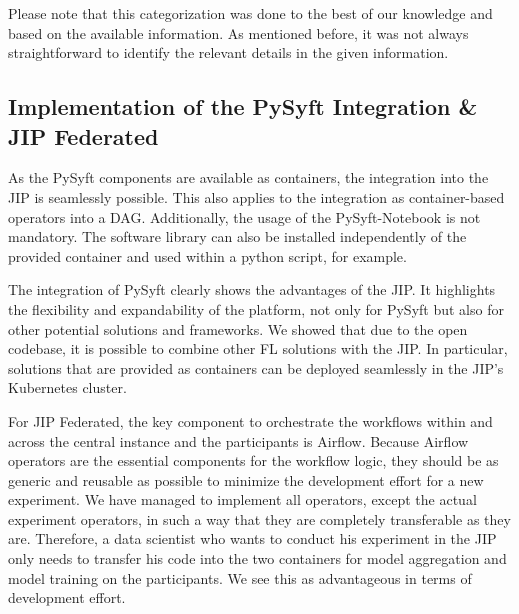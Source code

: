 Please note that this categorization was done to the best of our knowledge and based on the available information. As mentioned before, it was not always straightforward to identify the relevant details in the given information.





\subsection{Implementation of the PySyft Integration \& JIP Federated}
\label{subsec:DiscussionImplementation}
As the PySyft components are available as containers, the integration into the JIP is seamlessly possible. This also applies to the integration as container-based operators into a DAG.
Additionally, the usage of the PySyft-Notebook is not mandatory. The software library can also be installed independently of the provided container and used within a python script, for example.

The integration of PySyft clearly shows the advantages of the JIP. 
It highlights the flexibility and expandability of the platform, not only for PySyft but also for other potential solutions and frameworks. We showed that due to the open codebase, it is possible to combine other FL solutions with the JIP. In particular, solutions that are provided as containers can be deployed seamlessly in the JIP's Kubernetes cluster.

For JIP Federated, the key component to orchestrate the workflows within and across the central instance and the participants is Airflow.
Because Airflow operators are the essential components for the workflow logic, they should be as generic and reusable as possible to minimize the development effort for a new experiment. We have managed to implement all operators, except the actual experiment operators, in such a way that they are completely transferable as they are. Therefore, a data scientist who wants to conduct his experiment in the JIP only needs to transfer his code into the two containers for model aggregation and model training on the participants. We see this as advantageous in terms of development effort.

